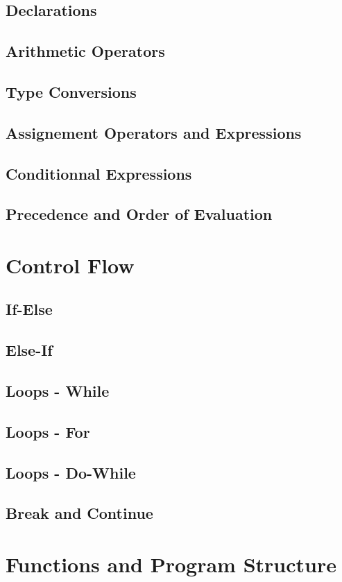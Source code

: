 \documentclass{scrartcl}
\begin{document}
        \subsection{Declarations}
        \subsection{Arithmetic Operators}
        \subsection{Type Conversions}
        \subsection{Assignement Operators and Expressions}
        \subsection{Conditionnal Expressions}
        \subsection{Precedence and Order of Evaluation}
    \section{Control Flow}
        \subsection{If-Else}
        \subsection{Else-If}
        \subsection{Loops - While}
        \subsection{Loops - For}
        \subsection{Loops - Do-While}
        \subsection{Break and Continue}
    \section{Functions and Program Structure}
\end{document}
